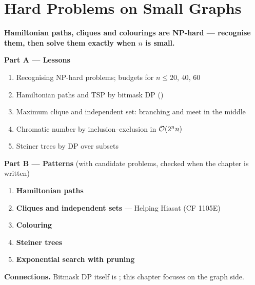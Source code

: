 \chapter{Hard Problems on Small Graphs}
\label{ch:hard_small}

\begin{tcolorbox}[enhanced, colback=white, colframe=secondaryblue, boxrule=1pt, arc=2mm]
\textbf{\large\textcolor{primaryblue}{Hamiltonian paths, cliques and colourings are NP-hard --- recognise them, then solve them exactly when $n$ is small.}}
\end{tcolorbox}


\begin{plannedbox}
\textbf{Part A --- Lessons}
\begin{enumerate}[leftmargin=*, label=\textbf{A\arabic*.}, itemsep=1pt]
    \item Recognising NP-hard problems; budgets for $n \le 20$, $40$, $60$
    \item Hamiltonian paths and TSP by bitmask DP ()
    \item Maximum clique and independent set: branching and meet in the middle
    \item Chromatic number by inclusion--exclusion in $\mathcal{O}(2^n n)$
    \item Steiner trees by DP over subsets
\end{enumerate}
\textbf{Part B --- Patterns} (with candidate problems, checked when the chapter is written)
\begin{enumerate}[leftmargin=*, label=\textbf{P\arabic*.}, itemsep=1pt]
    \item \textbf{Hamiltonian paths}
    \item \textbf{Cliques and independent sets} --- Helping Hiasat {\small\color{darkgray}(CF 1105E)}
    \item \textbf{Colouring}
    \item \textbf{Steiner trees}
    \item \textbf{Exponential search with pruning}
\end{enumerate}
\textbf{Connections.} Bitmask DP itself is ; this chapter focuses on the graph side.
\end{plannedbox}
